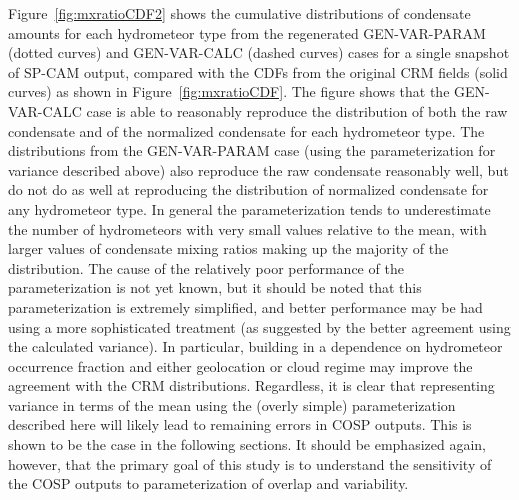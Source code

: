Figure~\ref{fig:mxratioCDF2} shows the cumulative distributions of
condensate amounts for each hydrometeor type from the regenerated
GEN-VAR-PARAM (dotted curves) and GEN-VAR-CALC (dashed curves) cases for
a single snapshot of SP-CAM output, compared with the CDFs from the
original CRM fields (solid curves) as shown in
Figure~\ref{fig:mxratioCDF}. The figure shows that the GEN-VAR-CALC case
is able to reasonably reproduce the distribution of both the raw
condensate and of the normalized condensate for each hydrometeor type.
The distributions from the GEN-VAR-PARAM case (using the
parameterization for variance described above) also reproduce the raw
condensate reasonably well, but do not do as well at reproducing the
distribution of normalized condensate for any hydrometeor type. In
general the parameterization tends to underestimate the number of
hydrometeors with very small values relative to the mean, with larger
values of condensate mixing ratios making up the majority of the
distribution. The cause of the relatively poor performance of the
parameterization is not yet known, but it should be noted that this
parameterization is extremely simplified, and better performance may be
had using a more sophisticated treatment (as suggested by the better
agreement using the calculated variance). In particular, building in a
dependence on hydrometeor occurrence fraction and either geolocation or
cloud regime may improve the agreement with the CRM distributions.
Regardless, it is clear that representing variance in terms of the mean
using the (overly simple) parameterization described here will likely
lead to remaining errors in COSP outputs. This is shown to be the case
in the following sections. It should be emphasized again, however, that
the primary goal of this study is to understand the sensitivity of the
COSP outputs to parameterization of overlap and variability.

